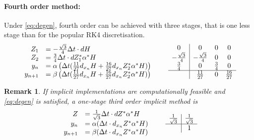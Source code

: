 \documentclass[a4paper,11pt]{article}
\newtheorem{remark}[theorem]{Remark}
\begin{document}
\paragraph*{Fourth order method:}
Under \eqref{eq:degen}, fourth order can be achieved with three stages, that is one less stage than for the popular RK4 discretisation.
\[
\begin{array}{rl}
Z_1&=-\frac{\sqrt{3}}{4}\Delta t \cdot d H \\
Z_2&=\frac{3}{4}\Delta t \cdot d Z_1^*\alpha^* H \\
y_n &= \alpha\left(\Delta t ( \frac{11}{27} d_{x_n} H + \frac{16}{27} d_{x_n} Z_2^*\alpha^*H)\right)\\
y_{n+1} &= \beta\left(\Delta t ( \frac{11}{27} d_{x_n} H + \frac{16}{27} d_{x_n} Z_2^*\alpha^*H)\right)
  \end{array}
\quad \quad
  \begin{array}{c|ccc}
    0 & 0 & 0 & 0 \\
    -\frac{\sqrt{3}}{4} & -\frac{\sqrt{3}}{4} & 0 & 0 \\
    \frac{3}{4} & 0 & \frac{3}{4} & 0 \\
    \hline
     & \frac{11}{27} & 0 & \frac{16}{27}
  \end{array}
 \]


\begin{remark}
If implicit implementations are computationally feasible and \eqref{eq:degen} is satisfied, a one-stage third order implicit method is
\[
\begin{array}{rl}
Z&=\frac{1}{\sqrt{3}}\Delta t \cdot d Z^*\alpha^* H\\
y_n &= \alpha(\Delta t \cdot  d_{x_n} Z^*\alpha^* H)\\
y_{n+1} &= \beta(\Delta t \cdot  d_{x_n} Z^*\alpha^* H) 
  \end{array}
  \quad\quad
  \begin{array}{c|c}
    \frac{1}{\sqrt{3}} & \frac{1}{\sqrt{3}} \\
    \hline
     & 1
  \end{array}   
\]
\end{remark}
\end{document}
